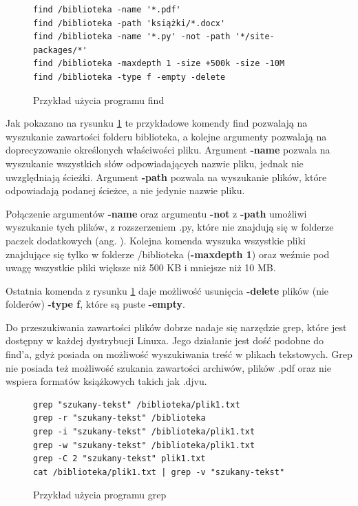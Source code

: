 \begin{figure}[h]
  \centering
\begin{tcolorbox}[
    colback=white,
    colframe=black,
    boxrule=0.5pt,
    arc=0pt
]
  \begin{verbatim}
find /biblioteka -name '*.pdf'
find /biblioteka -path 'książki/*.docx' 
find /biblioteka -name '*.py' -not -path '*/site-packages/*'  
find /biblioteka -maxdepth 1 -size +500k -size -10M           
find /biblioteka -type f -empty -delete 
  \end{verbatim}
\end{tcolorbox}
\caption{Przykład użycia programu find}
\label{fig:cmd:findExamples}
\end{figure}

Jak pokazano na rysunku \ref{fig:cmd:findExamples} te przykładowe komendy find
pozwalają na wyszukanie zawartości folderu biblioteka, a kolejne argumenty 
pozwalają na doprecyzowanie określonych właściwości pliku. Argument \textbf{-name}
pozwala na wyszukanie wszystkich słów odpowiadających nazwie pliku, jednak nie
uwzględniają ścieżki. Argument \textbf{-path} pozwala na wyszukanie plików, 
które odpowiadają podanej ścieżce, a nie jedynie nazwie pliku.

Połączenie argumentów \textbf{-name} oraz argumentu \textbf{-not} z \textbf{-path}
umożliwi wyszukanie tych plików, z rozszerzeniem .py, które nie znajdują się w
folderze paczek dodatkowych (ang. ). Kolejna komenda 
wyszuka wszystkie pliki znajdujące się tylko w folderze /biblioteka (\textbf{-maxdepth 1})
oraz weźmie pod uwagę wszystkie pliki większe niż 500 KB i mniejsze niż 10 MB.

Ostatnia komenda z rysunku \ref{fig:cmd:findExamples} daje możliwość usunięcia 
\textbf{-delete} plików (nie folderów) \textbf{-type f}, które są puste \textbf{-empty}.

Do przeszukiwania zawartości plików dobrze nadaje się narzędzie grep, które jest
dostępny w każdej dystrybucji Linuxa. Jego działanie jest dość podobne do find'a,
gdyż posiada on możliwość wyszukiwania treść w plikach tekstowych. Grep nie 
posiada też możliwość szukania zawartości archiwów, plików .pdf oraz nie wspiera
formatów książkowych takich jak .djvu.

\begin{figure}[h]
  \centering
\begin{tcolorbox}[
    colback=white,
    colframe=black,
    boxrule=0.5pt,
    arc=0pt
]
  \begin{verbatim}
grep "szukany-tekst" /biblioteka/plik1.txt 
grep -r "szukany-tekst" /biblioteka 
grep -i "szukany-tekst" /biblioteka/plik1.txt
grep -w "szukany-tekst" /biblioteka/plik1.txt
grep -C 2 "szukany-tekst" plik1.txt
cat /biblioteka/plik1.txt | grep -v "szukany-tekst" 
  \end{verbatim}
\end{tcolorbox}
\caption{Przykład użycia programu grep}
\label{fig:cmd:grepExamples}
\end{figure}

